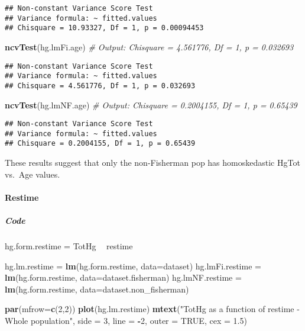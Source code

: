 \documentclass[12pt,]{article}
\newenvironment{Shaded}{\begin{snugshade}}{\end{snugshade}}
\newcommand{\KeywordTok}[1]{\textcolor[rgb]{0.13,0.29,0.53}{\textbf{#1}}}
\newcommand{\DataTypeTok}[1]{\textcolor[rgb]{0.13,0.29,0.53}{#1}}
\newcommand{\DecValTok}[1]{\textcolor[rgb]{0.00,0.00,0.81}{#1}}
\newcommand{\FloatTok}[1]{\textcolor[rgb]{0.00,0.00,0.81}{#1}}
\newcommand{\StringTok}[1]{\textcolor[rgb]{0.31,0.60,0.02}{#1}}
\newcommand{\CommentTok}[1]{\textcolor[rgb]{0.56,0.35,0.01}{\textit{#1}}}
\newcommand{\OtherTok}[1]{\textcolor[rgb]{0.56,0.35,0.01}{#1}}
\newcommand{\OperatorTok}[1]{\textcolor[rgb]{0.81,0.36,0.00}{\textbf{#1}}}
\newcommand{\NormalTok}[1]{#1}
\let\oldparagraph\paragraph
\renewcommand{\paragraph}[1]{\oldparagraph{#1}\mbox{}}
\let\oldsubparagraph\subparagraph
\renewcommand{\subparagraph}[1]{\oldsubparagraph{#1}\mbox{}}
\begin{document}
\begin{verbatim}
## Non-constant Variance Score Test 
## Variance formula: ~ fitted.values 
## Chisquare = 10.93327, Df = 1, p = 0.00094453
\end{verbatim}

\begin{Shaded}
\begin{Highlighting}[]
\KeywordTok{ncvTest}\NormalTok{(hg.lmFi.age) }\CommentTok{# Output: Chisquare = 4.561776, Df = 1, p = 0.032693}
\end{Highlighting}
\end{Shaded}

\begin{verbatim}
## Non-constant Variance Score Test 
## Variance formula: ~ fitted.values 
## Chisquare = 4.561776, Df = 1, p = 0.032693
\end{verbatim}

\begin{Shaded}
\begin{Highlighting}[]
\KeywordTok{ncvTest}\NormalTok{(hg.lmNF.age) }\CommentTok{# Output: Chisquare = 0.2004155, Df = 1, p = 0.65439}
\end{Highlighting}
\end{Shaded}

\begin{verbatim}
## Non-constant Variance Score Test 
## Variance formula: ~ fitted.values 
## Chisquare = 0.2004155, Df = 1, p = 0.65439
\end{verbatim}

These results suggest that only the non-Fisherman pop has homoskedastic
HgTot vs.~Age values.

\paragraph{Restime}\label{restime}

\subparagraph{Code}\label{code-1}

\begin{Shaded}
\begin{Highlighting}[]
\NormalTok{hg.form.restime =}\StringTok{ }\NormalTok{TotHg }\OperatorTok{~}\StringTok{ }\NormalTok{restime}

\NormalTok{hg.lm.restime =}\StringTok{ }\KeywordTok{lm}\NormalTok{(hg.form.restime, }\DataTypeTok{data=}\NormalTok{dataset)}
\NormalTok{hg.lmFi.restime =}\StringTok{ }\KeywordTok{lm}\NormalTok{(hg.form.restime, }\DataTypeTok{data=}\NormalTok{dataset.fisherman)}
\NormalTok{hg.lmNF.restime =}\StringTok{ }\KeywordTok{lm}\NormalTok{(hg.form.restime, }\DataTypeTok{data=}\NormalTok{dataset.non_fisherman)}

\KeywordTok{par}\NormalTok{(}\DataTypeTok{mfrow=}\KeywordTok{c}\NormalTok{(}\DecValTok{2}\NormalTok{,}\DecValTok{2}\NormalTok{))}
\KeywordTok{plot}\NormalTok{(hg.lm.restime)}
\KeywordTok{mtext}\NormalTok{(}\StringTok{"TotHg as a function of restime - Whole population"}\NormalTok{, }\DataTypeTok{side =} \DecValTok{3}\NormalTok{, }\DataTypeTok{line =} \OperatorTok{-}\DecValTok{2}\NormalTok{, }\DataTypeTok{outer =} \OtherTok{TRUE}\NormalTok{, }\DataTypeTok{cex =} \FloatTok{1.5}\NormalTok{)}
\end{Highlighting}
\end{Shaded}
\end{document}
